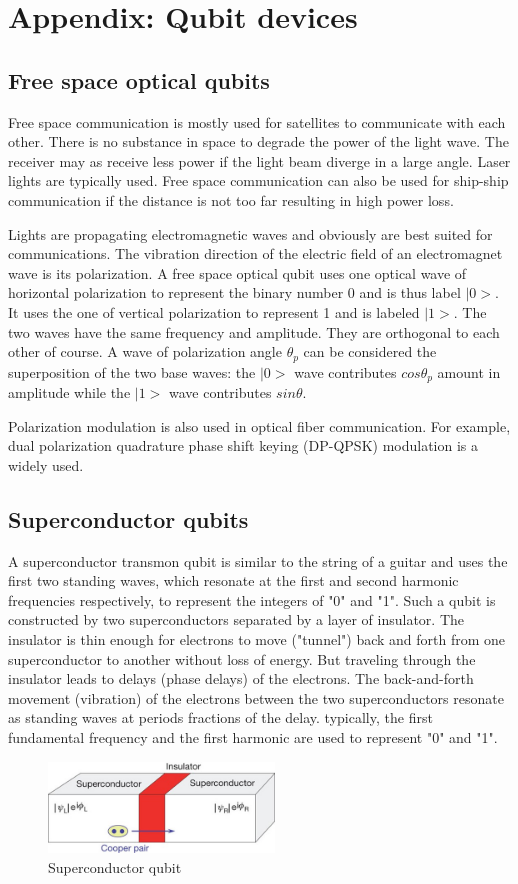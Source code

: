 \documentclass{book}
\begin{document}
\chapter{Appendix: Qubit devices}\label{A-qubit}

\section{Free space optical qubits}
Free space communication is mostly used for satellites to communicate with each other. There is no substance in space to degrade the power of the light wave. The receiver may as receive less power if the light beam diverge in a large angle. Laser lights are typically used. Free space communication can also be used for ship-ship communication if the distance is not too far resulting in high power loss.

Lights are propagating electromagnetic waves and obviously are best suited for communications. The vibration direction of the electric field of an electromagnet wave is its polarization. A free space optical qubit uses one optical wave of horizontal polarization to represent the binary number 0 and is thus label $|0>$. It uses the one of vertical polarization to represent 1 and is labeled $|1>$. The two waves have the same frequency and amplitude. They are orthogonal to each other of course. A wave of polarization angle $\theta_p$ can be considered the superposition of the two base waves: the $|0>$ wave contributes $cos\theta_p$ amount in amplitude while the $|1>$ wave contributes $sin\theta$.

Polarization modulation is also used in optical fiber communication. For example, dual polarization quadrature phase shift keying (DP-QPSK) modulation is a widely used.

\section{Superconductor qubits}
A superconductor transmon qubit is similar to the string of a guitar and uses the first two standing waves, which resonate at the first and second harmonic frequencies respectively, to represent the integers of "0" and "1". Such a qubit is constructed by two superconductors separated by a layer of insulator. The insulator is thin enough for electrons to move ("tunnel") back and forth from one superconductor to another without loss of energy. But traveling through the insulator leads to delays (phase delays) of the electrons. The back-and-forth movement (vibration) of the electrons between the two superconductors resonate as standing waves at periods fractions of the delay. typically, the first fundamental frequency and the first harmonic are used to represent "0" and "1".
\begin{figure}[ht]
\includegraphics[width=6cm]{pic/supercQubit.jpg}
\caption{Superconductor qubit}
\label{Superconductor}
\end{figure}
\end{document}
